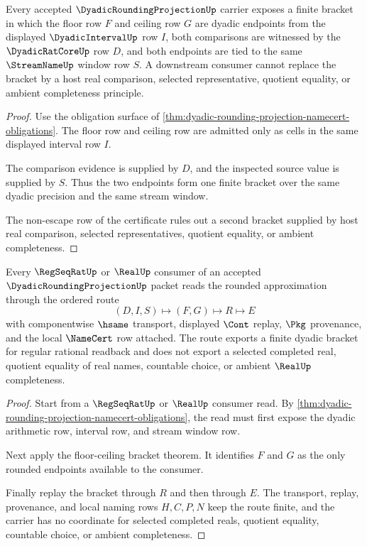 \begin{theorem}
\label{thm:dyadic-rounding-projection-floor-ceiling-bracket}
Every accepted $\DyadicRoundingProjectionUp$ carrier exposes a finite bracket in which the floor row $F$ and ceiling row $G$ are dyadic endpoints from the displayed $\DyadicIntervalUp$ row $I$, both comparisons are witnessed by the $\DyadicRatCoreUp$ row $D$, and both endpoints are tied to the same $\StreamNameUp$ window row $S$. A downstream consumer cannot replace the bracket by a host real comparison, selected representative, quotient equality, or ambient completeness principle.
\end{theorem}
\begin{proof}
Use the obligation surface of \autoref{thm:dyadic-rounding-projection-namecert-obligations}. The floor row and ceiling row are admitted only as cells in the same displayed interval row $I$.

The comparison evidence is supplied by $D$, and the inspected source value is supplied by $S$. Thus the two endpoints form one finite bracket over the same dyadic precision and the same stream window.

The non-escape row of the certificate rules out a second bracket supplied by host real comparison, selected representatives, quotient equality, or ambient completeness.
\end{proof}

\begin{theorem}
\label{thm:dyadic-rounding-projection-regseqrat-readback}
Every $\RegSeqRatUp$ or $\RealUp$ consumer of an accepted $\DyadicRoundingProjectionUp$ packet reads the rounded approximation through the ordered route
$$
(D,I,S)\longmapsto (F,G)\longmapsto R\longmapsto E
$$
with componentwise $\hsame$ transport, displayed $\Cont$ replay, $\Pkg$ provenance, and the local $\NameCert$ row attached. The route exports a finite dyadic bracket for regular rational readback and does not export a selected completed real, quotient equality of real names, countable choice, or ambient $\RealUp$ completeness.
\end{theorem}
\begin{proof}
Start from a $\RegSeqRatUp$ or $\RealUp$ consumer read. By \autoref{thm:dyadic-rounding-projection-namecert-obligations}, the read must first expose the dyadic arithmetic row, interval row, and stream window row.

Next apply the floor-ceiling bracket theorem. It identifies $F$ and $G$ as the only rounded endpoints available to the consumer.

Finally replay the bracket through $R$ and then through $E$. The transport, replay, provenance, and local naming rows $H,C,P,N$ keep the route finite, and the carrier has no coordinate for selected completed reals, quotient equality, countable choice, or ambient completeness.
\end{proof}


